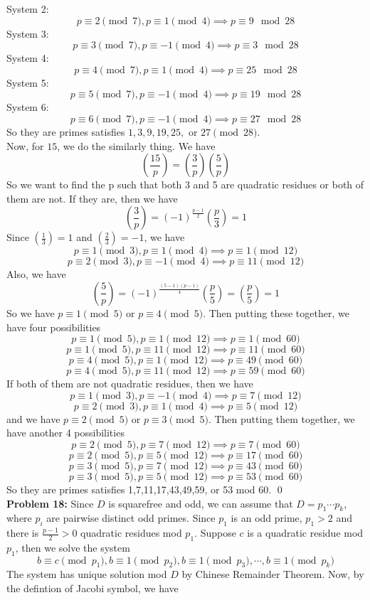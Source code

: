 \documentclass[12pt]{amsart}
\begin{document}
System 2: 
\[p\equiv 2 \pmod 7, p\equiv 1\pmod 4\implies p\equiv 9\mod 28\]
System 3: 
\[p\equiv 3 \pmod 7, p\equiv -1\pmod 4\implies p\equiv 3\mod 28\]
System 4: 
\[p\equiv 4 \pmod 7, p\equiv 1\pmod 4\implies p\equiv 25\mod 28\]
System 5: 
\[p\equiv 5 \pmod 7, p\equiv -1\pmod 4\implies p\equiv 19\mod 28\]
System 6: 
\[p\equiv 6 \pmod 7, p\equiv -1\pmod 4\implies p\equiv 27\mod 28\]
So they are primes satisfies $1,3,9,19,25,$ or $ 27\pmod {28}$.
\\Now, for $15$, we do the similarly thing. We have 
\[(\frac{15}{p})=(\frac{3}{p})(\frac{5}{p})\]
So we want to find the p such that both 3 and 5 are quadratic residues or both of them are not. If they are, then we have 
\[(\frac{3}{p})=(-1)^\frac{p-1}{2}(\frac{p}{3})=1\]
Since $(\frac{1}{3})=1$ and $(\frac{2}{3})=-1$, we have 
\[p\equiv 1\pmod 3, p\equiv 1\pmod 4\implies p\equiv1\pmod {12}\]
\[p\equiv 2\pmod 3, p\equiv -1\pmod 4\implies p\equiv11\pmod {12}\]
Also, we have 
\[(\frac{5}{p})=(-1)^{\frac{(5-1)(p-1)}{4}}(\frac{p}{5})=(\frac{p}{5})=1\]
So we have $p\equiv 1 \pmod 5$ or $p\equiv 4\pmod 5$.
Then putting these together, we have four possibilities
\[p\equiv 1\pmod 5,p\equiv 1\pmod{12}\implies p\equiv 1\pmod {60}\]
\[p\equiv 1\pmod 5,p\equiv 11\pmod{12}\implies p\equiv 11\pmod {60}\]
\[p\equiv 4\pmod 5,p\equiv 1\pmod{12}\implies p\equiv 49\pmod {60}\]
\[p\equiv 4\pmod 5,p\equiv 11\pmod{12}\implies p\equiv 59\pmod {60}\]
If both of them are not quadratic residues, then we have 
\[p\equiv 1\pmod 3, p\equiv -1\pmod 4\implies p\equiv 7\pmod {12}\]
\[p\equiv 2\pmod 3, p\equiv 1\pmod 4\implies p\equiv 5\pmod {12}\]
and we have $p\equiv 2 \pmod 5$ or $p\equiv 3\pmod 5$. Then putting them together, we have another 4 possibilities
\[p\equiv 2\pmod 5,p\equiv 7\pmod{12}\implies p\equiv 7\pmod {60}\]
\[p\equiv 2\pmod 5,p\equiv 5\pmod{12}\implies p\equiv 17\pmod {60}\]
\[p\equiv 3\pmod 5,p\equiv 7\pmod{12}\implies p\equiv 43\pmod {60}\]
\[p\equiv 3\pmod 5,p\equiv 5\pmod{12}\implies p\equiv 53\pmod {60}\]
So they are primes satisfies 1,7,11,17,43,49,59, or 53 mod 60.
\qed\\
\textbf{Problem 18:} Since $D$ is squarefree and odd, we can assume that $D=p_1\cdots p_k$, where $p_i$ are pairwise distinct odd primes. Since $p_1$ is an odd prime, $p_1>2$ and there is $\frac{p-1}{2}>0$ quadratic residues mod $p_1$. Suppose $c$ is a quadratic residue mod $p_1$, then we solve the system 
\[b\equiv c\pmod {p_1},b\equiv 1\pmod {p_2},b\equiv 1\pmod {p_3},\cdots, b\equiv 1\pmod {p_k}\]
The system has unique solution mod $D$ by Chinese Remainder Theorem. Now, by the defintion of Jacobi symbol, we have 
\end{document}
